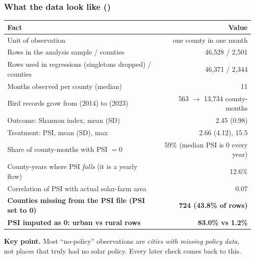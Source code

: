 \documentclass[11pt]{article}
\begin{document}
\subsubsection*{What the data look like ()}
\begin{table}[H]\centering\small
\begin{tabularx}{\linewidth}{>{\raggedright\arraybackslash}Xr}
\toprule
Fact & Value\\
\midrule
Unit of observation & one county in one month\\
Rows in the analysis sample / counties & 46,528 / 2,501\\
Rows used in regressions (singletons dropped) / counties & 46,371 / 2,344\\
Months observed per county (median) & 11\\
Bird records grow from (2014) to (2023) & 563 $\to$ 13,734 county-months\\
Outcome: Shannon index, mean (SD) & 2.45 (0.98)\\
Treatment: PSI, mean (SD), max & 2.66 (4.12), 15.5\\
Share of county-months with PSI $=0$ & 59\% (median PSI is 0 every year)\\
County-years where PSI \emph{falls} (it is a yearly flow) & 12.6\%\\
Correlation of PSI with actual solar-farm area & 0.07\\
\textbf{Counties missing from the PSI file (PSI set to 0)} & \textbf{724 (43.8\% of rows)}\\
\textbf{PSI imputed as 0: urban vs rural rows} & \textbf{83.0\% vs 1.2\%}\\
\bottomrule
\end{tabularx}
\end{table}
\begin{whybox}\small
\textbf{Key point.} Most ``no-policy'' observations are \emph{cities with missing policy data}, not places that truly had no solar policy. Every later check comes back to this.
\end{whybox}

\end{document}
